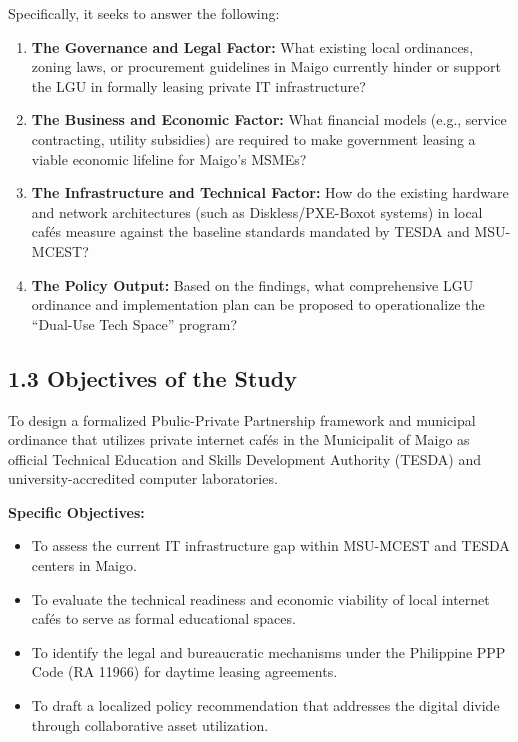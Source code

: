 Specifically, it seeks to answer the following:
\begin{enumerate}
    \item \textbf{The Governance and Legal Factor:} What existing local ordinances, zoning laws, or procurement guidelines in Maigo currently hinder or support the LGU in formally leasing private IT infrastructure?
    \item \textbf{The Business and Economic Factor:} What financial models (e.g., service contracting, utility subsidies) are required to make government leasing a viable economic lifeline for Maigo’s MSMEs?
    \item \textbf{The Infrastructure and Technical Factor:} How do the existing hardware and network architectures (such as Diskless/PXE-Boxot systems) in local cafés measure against the baseline standards mandated by TESDA and MSU-MCEST?
    \item \textbf{The Policy Output:} Based on the findings, what comprehensive LGU ordinance and implementation plan can be proposed to operationalize the ``Dual-Use Tech Space'' program?
\end{enumerate}

\subsection*{1.3 Objectives of the Study}
To design a formalized Pbulic-Private Partnership framework and municipal ordinance that utilizes private internet cafés in the Municipalit of Maigo as official Technical Education and Skills Development Authority (TESDA) and university-accredited computer laboratories.

\textbf{Specific Objectives:}
\begin{itemize}
    \item To assess the current IT infrastructure gap within MSU-MCEST and TESDA centers in Maigo.
    \item To evaluate the technical readiness and economic viability of local internet cafés to serve as formal educational spaces.
    \item To identify the legal and bureaucratic mechanisms under the Philippine PPP Code (RA 11966) for daytime leasing agreements.
    \item To draft a localized policy recommendation that addresses the digital divide through collaborative asset utilization.
\end{itemize}

